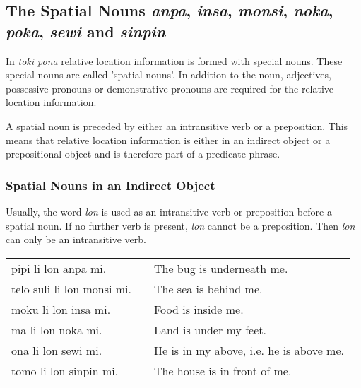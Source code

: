 %
%
\newpage
{}
\subsection*{The Spatial Nouns \textit{anpa}, \textit{insa}, \textit{monsi}, \textit{noka}, \textit{poka}, \textit{sewi} and \textit{sinpin}}
%

In \textit{toki pona} relative location information is formed with special nouns. 
These special nouns are called 'spatial nouns'. 
In addition to the noun, adjectives, possessive pronouns or demonstrative pronouns are required for the relative location information. 

A spatial noun is preceded by either an intransitive verb or a preposition. 
This means that relative location information is either in an indirect object or a prepositional object and is therefore part of a predicate phrase.

%
\subsubsection*{Spatial Nouns in an Indirect Object}
%

Usually, the word \textit{lon} is used as an intransitive verb or preposition before a spatial noun. 
If no further verb is present, \textit{lon} cannot be a preposition. 
Then \textit{lon} can only be an intransitive verb.

\begin{supertabular}{p{5,5cm}|ll}
pipi li lon anpa mi.       && The bug is underneath me. \\
telo suli li lon monsi mi. && The sea is behind me.  \\
moku li lon insa mi.       && Food is inside me. \\
ma li lon noka mi.         && Land is under my feet. \\
ona li lon sewi mi.        && He is in my above, i.e. he is above me. \\
tomo li lon sinpin mi.     && The house is in front of me. \\
\end{supertabular} 

